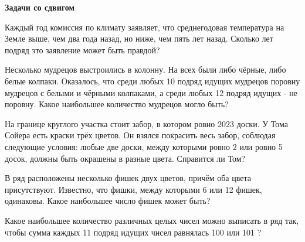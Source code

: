 \centerline{\bf \Huge Задачи со сдвигом}

\begin{flushright}
        \scriptsize{}
\end{flushright}

Каждый год комиссия по климату заявляет, что среднегодовая температура на Земле выше, чем два года назад, но ниже, чем пять лет назад. Сколько лет подряд это заявление может быть правдой?

Несколько мудрецов выстроились в колонну. На всех были либо чёрные, либо белые колпаки. Оказалось, что среди любых 10 подряд идущих мудрецов поровну мудрецов с белыми и чёрными колпаками, а среди любых 12 подряд идущих - не поровну. Какое наибольшее количество мудрецов могло быть?

На границе круглого участка стоит забор, в котором ровно 2023 доски. У Тома Сойера есть краски трёх цветов. Он взялся покрасить весь забор, соблюдая следующие условия: любые две доски, между которыми ровно 2 или ровно 5 досок, должны быть окрашены в разные цвета. Справится ли Том?

В ряд расположены несколько фишек двух цветов, причём оба цвета присутствуют. Известно, что фишки, между которыми 6 или 12 фишек, одинаковы. Какое наибольшее число фишек может быть?

Какое наибольшее количество различных целых чисел можно выписать в ряд так, чтобы сумма каждых 11 подряд идущих чисел равнялась 100 или 101 ?
